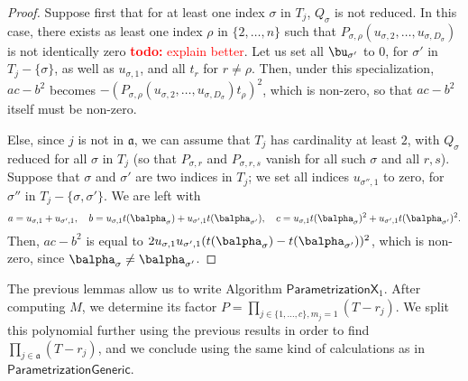 \documentclass[12pt]{article}
\newcommand{\todo}[1]{\textcolor{red}{{\bf todo:} #1}}
\begin{document}
\begin{proof}
	Suppose first that for at least one index $\sigma$ in $T_j$,
	$Q_\sigma$ is not reduced. In this case, there exists as least one
	index $\rho$ in $\{2,\dots,n\}$ such that
	$P_{\sigma,\rho}(u_{\sigma,2},\dots,u_{\sigma,D_\sigma})$ is not
	identically zero \todo{explain better}. Let us set all $\bu_{\sigma'}$
	to $0$, for $\sigma'$ in $T_j-\{\sigma\}$, as well as $u_{\sigma,1}$,
	and all $t_r$ for $r\ne \rho$. Then, under this specialization,
	$ac-b^2$ becomes
	$-(P_{\sigma,\rho}(u_{\sigma,2},\dots,u_{\sigma,D_\sigma})t_\rho)^2$,
	which is non-zero, so that $ac-b^2$ itself must be non-zero.
	
	Else, since $j$ is not in $\mathfrak{a}$, we can assume that $T_j$
	has cardinality at least $2$, with $Q_\sigma$ reduced for all $\sigma$
	in $T_j$ (so that $P_{\sigma,r}$ and $P_{\sigma,r,s}$ vanish for 
	all such $\sigma$ and all $r,s$). Suppose that $\sigma$ and $\sigma'$ are two indices in
	$T_j$; we set all indices $u_{\sigma'',1}$ to zero, for $\sigma''$
	in $T_j-\{\sigma,\sigma'\}$. We are left with
	$$
	a=u_{\sigma,1}+u_{\sigma',1},\quad
	b=u_{\sigma,1}t(\balpha_{\sigma})+u_{\sigma',1}t(\balpha_{\sigma'}),\quad
	c=u_{\sigma,1}t(\balpha_{\sigma})^2+u_{\sigma',1}t(\balpha_{\sigma'})^2.
	$$
	Then, $ac-b^2$ is equal to $2u_{\sigma,1}u_{\sigma',1}(t(\balpha_{\sigma})-t(\balpha_{\sigma'}))^2$,
	which is non-zero, since $\balpha_\sigma \ne \balpha_{\sigma'}$.
\end{proof}

The previous lemmas allow us to write Algorithm
$\mathsf{ParametrizationX}_1$. After computing $M$, we determine its
factor $P=\prod_{j \in \{1,\dots,c\}, m_j=1} (T-r_j)$. We split this
polynomial further using the previous results in order to find
$\prod_{j \in \mathfrak{a}} (T-r_j)$, and we conclude using the same
kind of calculations as in $\mathsf{ParametrizationGeneric}$.
\end{document}
